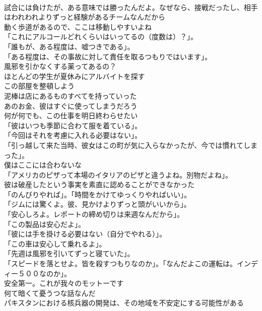 \documentclass[8pt]{extreport}
\begin{document}
\begin{CJK}{UTF8}{min}
\\	試合には負けたが、ある意味では勝ったんだよ。なぜなら、接戦だったし、相手はわれわれよりずっと経験があるチームなんだから	
\\	動く歩道があるので、ここは移動しやすいよね	
\\	「これにアルコールどれくらいはいってるの（度数は）？」。	
\\	「誰もが、ある程度は、嘘つきである」。	
\\	「ある程度は、その事故に対して責任を取るつもりではいます」。	
\\	風邪を引かなくする薬ってあるの？	
\\	ほとんどの学生が夏休みにアルバイトを探す	
\\	この部屋を整頓しよう	
\\	泥棒は店にあるものすべてを持っていった	
\\	あのお金、彼はすぐに使ってしまうだろう	
\\	何が何でも、この仕事を明日終わらせたい	
\\	「彼はいつも季節に合わて服を着ている」。	
\\	「今回はそれを考慮に入れる必要はない」。	
\\	「引っ越して来た当時、彼女はこの町が気に入らなかったが、今では慣れてしまった」。	
\\	僕はここには合わないな	
\\	「アメリカのピザって本場のイタリアのピザと違うよね。別物だよね」。	
\\	彼は破産したという事実を素直に認めることができなかった	
\\	「のんびりやれば」。「時間をかけてゆっくりやればいい」。	
\\	「ジムには驚くよ。彼、見かけよりずっと頭がいいから」。	
\\	「安心しろよ。レポートの締め切りは来週なんだから」。	
\\	「この製品は安心だよ」。	
\\	「彼には手を掛ける必要はない（自分でやれる）」。	
\\	「この車は安心して乗れるよ」。	
\\	「先週は風邪を引いてずっと寝ていた」。	
\\	「スピードを落とせよ。皆を殺すつもりなのか」。「なんだよこの運転は。インディー５００なのか」。	
\\	安全第一。これが我々のモットーです	
\\	何て暗くて憂うつな話なんだ	
\\	パキスタンにおける核兵器の開発は、その地域を不安定にする可能性がある	

\end{CJK}
\end{document}
